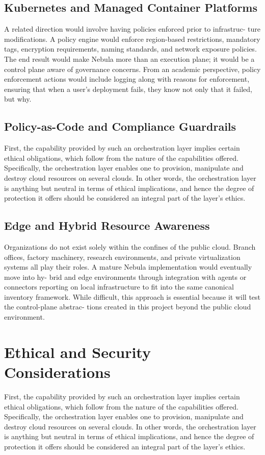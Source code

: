 \subsection{Kubernetes and Managed Container Platforms}
A related direction would involve having policies enforced prior to infrastruc- ture modifications. A policy engine would enforce region-based restrictions, mandatory tags, encryption requirements, naming standards, and network exposure policies. The end result would make Nebula more than an execution plane; it would be a control plane aware of governance concerns. From an academic perspective, policy enforcement actions would include logging along with reasons for enforcement, ensuring that when a user’s deployment fails, they know not only that it failed, but why.

\subsection{Policy-as-Code and Compliance Guardrails}
First, the capability provided by such an orchestration layer implies certain ethical obligations, which follow from the nature of the capabilities offered. Specifically, the orchestration layer enables one to provision, manipulate and destroy cloud resources on several clouds. In other words, the orchestration layer is anything but neutral in terms of ethical implications, and hence the degree of protection it offers should be considered an integral part of the layer’s ethics.

\subsection{Edge and Hybrid Resource Awareness}
Organizations do not exist solely within the confines of the public cloud. Branch offices, factory machinery, research environments, and private virtualization systems all play their roles. A mature Nebula implementation would eventually move into hy- brid and edge environments through integration with agents or connectors reporting on local infrastructure to fit into the same canonical inventory framework. While difficult, this approach is essential because it will test the control-plane abstrac- tions created in this project beyond the public cloud environment.

\section{Ethical and Security Considerations}
First, the capability provided by such an orchestration layer implies certain ethical obligations, which follow from the nature of the capabilities offered. Specifically, the orchestration layer enables one to provision, manipulate and destroy cloud resources on several clouds. In other words, the orchestration layer is anything but neutral in terms of ethical implications, and hence the degree of protection it offers should be considered an integral part of the layer’s ethics.

